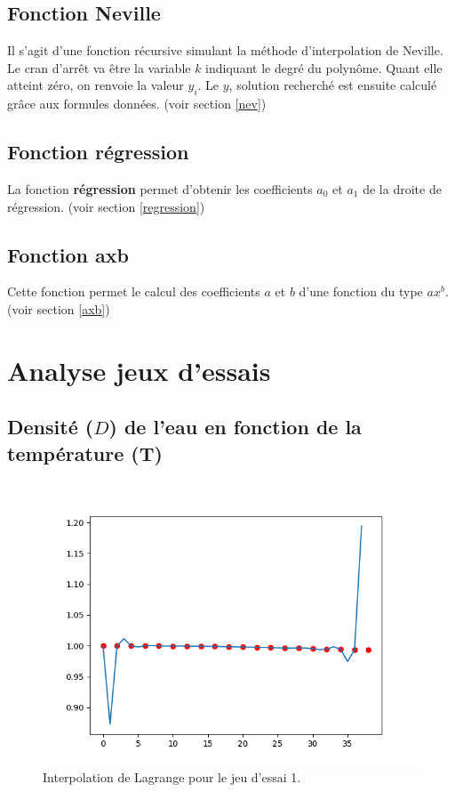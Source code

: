 \documentclass[12pt,french,titlepage]{article}
\begin{document}
	\subsection{Fonction Neville}
	
	\medskip
	Il s'agit d'une fonction récursive simulant la méthode d'interpolation de Neville. Le cran d'arrêt va être la variable $k$ indiquant le degré du polynôme. Quant elle atteint zéro, on renvoie la valeur $y_i$. Le $y$, solution recherché est ensuite calculé grâce aux formules données. (voir section \ref{nev})
	\subsection{Fonction régression}
	
	
	La fonction \textbf{régression} permet d'obtenir les coefficients $a_0$ et $a_1$ de  la droite de régression. (voir section \ref{regression})
	\subsection{Fonction axb}
	
	\medskip
	Cette fonction permet le calcul des coefficients $a$ et $b$ d'une fonction du type $ax^b$. (voir section \ref{axb})
	\section{Analyse jeux d'essais}
	
	\subsection{Densité ($D$) de l'eau en fonction de la température (T)}
		\begin{figure}[H]
		\includegraphics[width=\textwidth]{"11.png"}
		\caption{Interpolation de Lagrange pour le jeu d'essai 1.}
		\end{figure}
		
\end{document}
